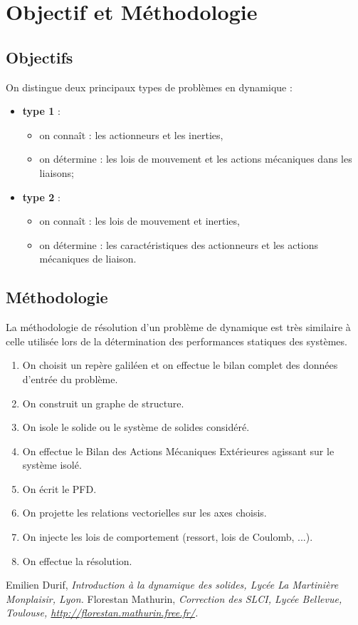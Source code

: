 \documentclass[10pt,fleqn]{article} %
\begin{document}
\section{Objectif et Méthodologie}

\subsection{Objectifs}
On distingue deux principaux types de problèmes en dynamique : 
\begin{itemize}
\item \textbf{type 1} :
\begin{itemize}
\item on connaît : les actionneurs et les inerties,
\item on détermine : les lois de mouvement et les actions mécaniques dans les liaisons;
\end{itemize} 
\item \textbf{type 2} :
\begin{itemize}
\item on connaît : les lois de mouvement et inerties,
\item on détermine : les caractéristiques des actionneurs et les actions mécaniques de liaison.
\end{itemize}
\end{itemize}

\subsection{Méthodologie}
La méthodologie de résolution d'un problème de dynamique est très similaire à celle utilisée lors de la détermination des performances statiques des systèmes.

\begin{enumerate}
\item On choisit un repère galiléen et on effectue le bilan complet des données d'entrée du problème.
\item On construit un graphe de structure.
\item On isole le solide ou le système de solides considéré.
\item On effectue le Bilan des Actions Mécaniques Extérieures agissant sur le système isolé.
\item On écrit le PFD.
\item On projette les relations vectorielles sur les axes choisis.
\item On injecte les lois de comportement (ressort, lois de Coulomb, ...).
\item On effectue la résolution.
\end{enumerate}



\begin{thebibliography}{2}
    Emilien Durif, {\it Introduction à la dynamique des solides, Lycée La Martinière Monplaisir, Lyon.}
       Florestan Mathurin, {\it Correction des SLCI, Lycée Bellevue, Toulouse, \url{http://florestan.mathurin.free.fr/}.}



\end{thebibliography}
\end{document}
